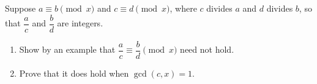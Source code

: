 Suppose $a\equiv b\pmod{x}$ and $c\equiv d\pmod{x}$, where $c$ divides $a$ and $d$ divides $b$, so that $\dfrac{a}{c}$ and $\dfrac{b}{d}$ are integers.
\begin{enumerate}
\item[(a)] Show by an example that $\dfrac{a}{c}\equiv\dfrac{b}{d}\pmod{x}$ need not hold.
\item[(b)] Prove that it does hold when $\gcd(c,x)=1$.
\end{enumerate}
